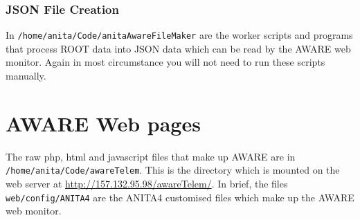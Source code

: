 \documentclass{article}
\begin{document}
\subsubsection{JSON File Creation}
In {\tt /home/anita/Code/anitaAwareFileMaker} are the worker scripts and programs that process ROOT data into JSON data which can be read by the AWARE web monitor. Again in most circumstance you will not need to run these scripts manually.

\section{AWARE Web pages}
The raw php, html and javascript files that make up AWARE are in {\tt /home/anita/Code/awareTelem}. This is the directory which is mounted on the web server at \url{http://157.132.95.98/awareTelem/}. In brief, the files {\tt web/config/ANITA4} are the ANITA4 customised files which make up the AWARE web monitor.
\end{document}
